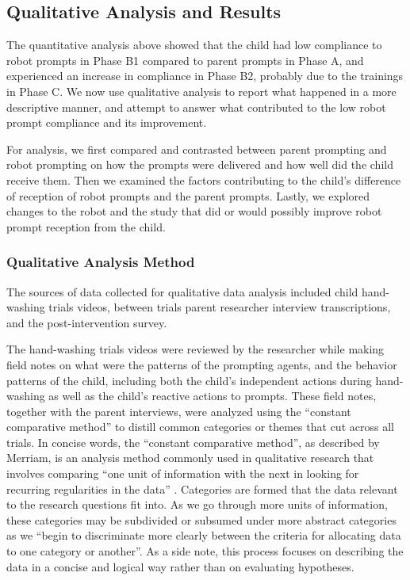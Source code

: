 \subsection{Qualitative Analysis and Results}
\label{sec:QualitativeData_results}
The quantitative analysis above showed that the child had low compliance to robot prompts in Phase B1 compared to parent prompts in Phase A, and experienced an increase in compliance in Phase B2, probably due to the trainings in Phase C.  We now use qualitative analysis to report what happened in a more descriptive manner, and attempt to answer what contributed to the low robot prompt compliance and its improvement.

For analysis, we first compared and contrasted between parent prompting and robot prompting on how the prompts were delivered and how well did the child receive them.  Then we examined the factors contributing to the child's difference of reception of robot prompts and the parent prompts.  Lastly, we explored changes to the robot and the study that did or would possibly improve robot prompt reception from the child.

\subsubsection{Qualitative Analysis Method}
The sources of data collected for qualitative data analysis included child hand-washing trials videos, between trials parent researcher interview transcriptions, and the post-intervention survey.

The hand-washing trials videos were reviewed by the researcher while making field notes on what were the patterns of the prompting agents, and the behavior patterns of the child, including both the child's independent actions during hand-washing as well as the child's reactive actions to prompts.  These field notes, together with the parent interviews, were analyzed using the ``constant comparative method'' to distill common categories or themes that cut across all trials.  In concise words, the ``constant comparative method'', as described by Merriam, is an analysis method commonly used in qualitative research that involves comparing ``one unit of information with the next in looking for recurring regularities in the data'' \cite{merriam2014qualitative}.  Categories are formed that the data relevant to the research questions fit into.  As we go through more units of information, these categories may be subdivided or subsumed under more abstract categories as we ``begin to discriminate more clearly between the criteria for allocating data to one category or another''.  As a side note, this process focuses on describing the data in a concise and logical way rather than on evaluating hypotheses.

